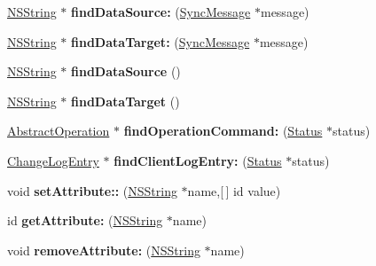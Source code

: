 \begin{DoxyCompactItemize}
\item 
\hypertarget{interface_session_ad0d93bd00c6a7ba4c95257571886423c}{
\hyperlink{class_n_s_string}{\-N\-S\-String} $\ast$ {\bfseries find\-Data\-Source\-:} (\hyperlink{interface_sync_message}{\-Sync\-Message} $\ast$message)}
\label{interface_session_ad0d93bd00c6a7ba4c95257571886423c}

\item 
\hypertarget{interface_session_af0cb145bf4a3db91991bb348bff540e2}{
\hyperlink{class_n_s_string}{\-N\-S\-String} $\ast$ {\bfseries find\-Data\-Target\-:} (\hyperlink{interface_sync_message}{\-Sync\-Message} $\ast$message)}
\label{interface_session_af0cb145bf4a3db91991bb348bff540e2}

\item 
\hypertarget{interface_session_a21da035a25ad0292ca1517acd008ec33}{
\hyperlink{class_n_s_string}{\-N\-S\-String} $\ast$ {\bfseries find\-Data\-Source} ()}
\label{interface_session_a21da035a25ad0292ca1517acd008ec33}

\item 
\hypertarget{interface_session_a01ae9d91dde11dc0842a94a16db723cd}{
\hyperlink{class_n_s_string}{\-N\-S\-String} $\ast$ {\bfseries find\-Data\-Target} ()}
\label{interface_session_a01ae9d91dde11dc0842a94a16db723cd}

\item 
\hypertarget{interface_session_a46def7766c05ca82f5ff6c5aa9b55be6}{
\hyperlink{interface_abstract_operation}{\-Abstract\-Operation} $\ast$ {\bfseries find\-Operation\-Command\-:} (\hyperlink{interface_status}{\-Status} $\ast$status)}
\label{interface_session_a46def7766c05ca82f5ff6c5aa9b55be6}

\item 
\hypertarget{interface_session_ad174f6009629ba580d236c4d97126e71}{
\hyperlink{interface_change_log_entry}{\-Change\-Log\-Entry} $\ast$ {\bfseries find\-Client\-Log\-Entry\-:} (\hyperlink{interface_status}{\-Status} $\ast$status)}
\label{interface_session_ad174f6009629ba580d236c4d97126e71}

\item 
\hypertarget{interface_session_aaa98df920a79a516f65453f1316fe291}{
void {\bfseries set\-Attribute\-::} (\hyperlink{class_n_s_string}{\-N\-S\-String} $\ast$name,\mbox{[}$\,$\mbox{]} id value)}
\label{interface_session_aaa98df920a79a516f65453f1316fe291}

\item 
\hypertarget{interface_session_a6ded3ac7939359bddc5717e624af015f}{
id {\bfseries get\-Attribute\-:} (\hyperlink{class_n_s_string}{\-N\-S\-String} $\ast$name)}
\label{interface_session_a6ded3ac7939359bddc5717e624af015f}

\item 
\hypertarget{interface_session_a1493466538c27b3cb6624e5be1f9a9bf}{
void {\bfseries remove\-Attribute\-:} (\hyperlink{class_n_s_string}{\-N\-S\-String} $\ast$name)}
\label{interface_session_a1493466538c27b3cb6624e5be1f9a9bf}

\end{DoxyCompactItemize}
